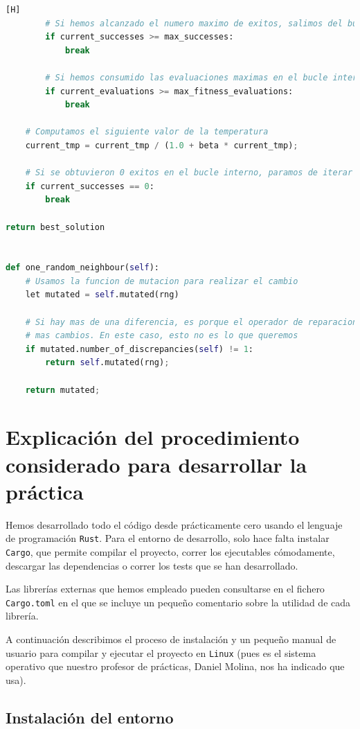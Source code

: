 \documentclass[11pt]{article}
\begin{document}
\begin{lstlisting}[language=Python, style=Boxed][H]
        # Si hemos alcanzado el numero maximo de exitos, salimos del bucle interno
        if current_successes >= max_successes:
            break

        # Si hemos consumido las evaluaciones maximas en el bucle interno, debemos salir
        if current_evaluations >= max_fitness_evaluations:
            break

    # Computamos el siguiente valor de la temperatura
    current_tmp = current_tmp / (1.0 + beta * current_tmp);

    # Si se obtuvieron 0 exitos en el bucle interno, paramos de iterar
    if current_successes == 0:
        break

return best_solution


def one_random_neighbour(self):
    # Usamos la funcion de mutacion para realizar el cambio
    let mutated = self.mutated(rng)

    # Si hay mas de una diferencia, es porque el operador de reparacion ha reparado provocando
    # mas cambios. En este caso, esto no es lo que queremos
    if mutated.number_of_discrepancies(self) != 1:
        return self.mutated(rng);

    return mutated;
\end{lstlisting}

\pagebreak

\section{Explicación del procedimiento considerado para desarrollar la práctica}

Hemos desarrollado todo el código desde prácticamente cero usando el lenguaje de programación \lstinline{Rust}. Para el entorno de desarrollo, solo hace falta instalar \lstinline{Cargo}, que permite compilar el proyecto, correr los ejecutables cómodamente, descargar las dependencias o correr los tests que se han desarrollado.

Las librerías externas que hemos empleado pueden consultarse en el fichero \lstinline{Cargo.toml} en el que se incluye un pequeño comentario sobre la utilidad de cada librería.

A continuación describimos el proceso de instalación y un pequeño manual de usuario para compilar y ejecutar el proyecto en \lstinline{Linux} (pues es el sistema operativo que nuestro profesor de prácticas, Daniel Molina, nos ha indicado que usa).

\subsection{Instalación del entorno}
\end{document}
